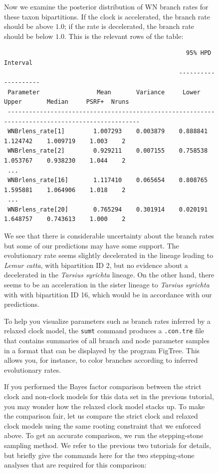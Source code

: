 \documentclass[12pt]{book}
\newcommand{\ttt}[1]{\texttt{#1}}
\begin{document}
\begin{figure}[h]
Now we examine the posterior distribution of WN branch rates for these taxon bipartitions. If the
clock is accelerated, the branch rate should be above $1.0$; if the rate is decelerated, the branch
rate should be below $1.0$. This is the relevant rows of the table:

\scriptsize
\begin{singlespacing}
\begin{verbatim}
                                                   95% HPD Interval
                                                 --------------------
 Parameter                Mean       Variance     Lower       Upper       Median     PSRF+  Nruns
 ------------------------------------------------------------------------------------------------
 WNBrlens_rate[1]        1.007293    0.003879    0.888841    1.124742    1.009719    1.003    2
 WNBrlens_rate[2]        0.929211    0.007155    0.758538    1.053767    0.938230    1.044    2
 ...
 WNBrlens_rate[16]       1.117410    0.065654    0.808765    1.595881    1.064906    1.018    2
 ...
 WNBrlens_rate[20]       0.765294    0.301914    0.020191    1.648757    0.743613    1.000    2

\end{verbatim}
\end{singlespacing}
\normalsize

We see that there is considerable uncertainty about the branch rates but some of our predictions
may have some support. The evolutionary rate seems slightly decelerated in the lineage leading to
\textit{Lemur catta}, with bipartition ID 2, but no evidence about a decelerated in the
\textit{Tarsius syrichta} lineage. On the other hand, there seems to be an acceleration in the
sister lineage to \textit{Tarsius syrichta} with with bipartition ID 16, which would be in
accordance with our predictions.

To help you visualize parameters such as branch rates inferred by a relaxed clock model, the
\ttt{sumt} command produces a \ttt{.con.tre} file that contains summaries of all branch and node
parameter samples in a format that can be displayed by the program FigTree. This allows you, for
instance, to color branches according to inferred evolutionary rates.

If you performed the Bayes factor comparison between the strict clock and non-clock models for this
data set in the previous tutorial, you may wonder how the relaxed clock model stacks up. To make
the comparison fair, let us compare the strict clock and relaxed clock models using the same
rooting constraint that we enforced above. To get an accurate comparison, we run the stepping-stone
sampling method. We refer to the previous two tutorials for details, but briefly give the commands
here for the two stepping-stone analyses that are required for this comparison:


\end{figure}
\end{document}
